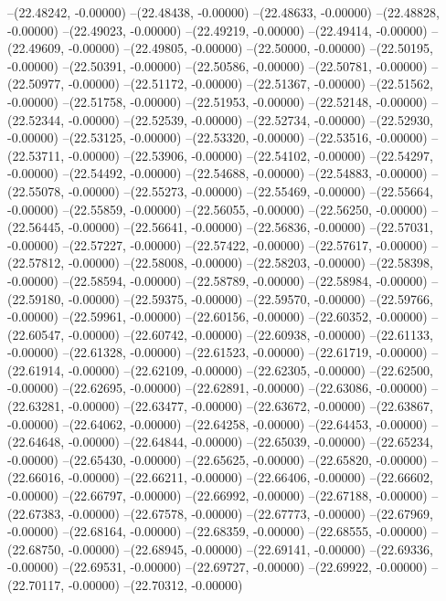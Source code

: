 --(22.48242, -0.00000)
--(22.48438, -0.00000)
--(22.48633, -0.00000)
--(22.48828, -0.00000)
--(22.49023, -0.00000)
--(22.49219, -0.00000)
--(22.49414, -0.00000)
--(22.49609, -0.00000)
--(22.49805, -0.00000)
--(22.50000, -0.00000)
--(22.50195, -0.00000)
--(22.50391, -0.00000)
--(22.50586, -0.00000)
--(22.50781, -0.00000)
--(22.50977, -0.00000)
--(22.51172, -0.00000)
--(22.51367, -0.00000)
--(22.51562, -0.00000)
--(22.51758, -0.00000)
--(22.51953, -0.00000)
--(22.52148, -0.00000)
--(22.52344, -0.00000)
--(22.52539, -0.00000)
--(22.52734, -0.00000)
--(22.52930, -0.00000)
--(22.53125, -0.00000)
--(22.53320, -0.00000)
--(22.53516, -0.00000)
--(22.53711, -0.00000)
--(22.53906, -0.00000)
--(22.54102, -0.00000)
--(22.54297, -0.00000)
--(22.54492, -0.00000)
--(22.54688, -0.00000)
--(22.54883, -0.00000)
--(22.55078, -0.00000)
--(22.55273, -0.00000)
--(22.55469, -0.00000)
--(22.55664, -0.00000)
--(22.55859, -0.00000)
--(22.56055, -0.00000)
--(22.56250, -0.00000)
--(22.56445, -0.00000)
--(22.56641, -0.00000)
--(22.56836, -0.00000)
--(22.57031, -0.00000)
--(22.57227, -0.00000)
--(22.57422, -0.00000)
--(22.57617, -0.00000)
--(22.57812, -0.00000)
--(22.58008, -0.00000)
--(22.58203, -0.00000)
--(22.58398, -0.00000)
--(22.58594, -0.00000)
--(22.58789, -0.00000)
--(22.58984, -0.00000)
--(22.59180, -0.00000)
--(22.59375, -0.00000)
--(22.59570, -0.00000)
--(22.59766, -0.00000)
--(22.59961, -0.00000)
--(22.60156, -0.00000)
--(22.60352, -0.00000)
--(22.60547, -0.00000)
--(22.60742, -0.00000)
--(22.60938, -0.00000)
--(22.61133, -0.00000)
--(22.61328, -0.00000)
--(22.61523, -0.00000)
--(22.61719, -0.00000)
--(22.61914, -0.00000)
--(22.62109, -0.00000)
--(22.62305, -0.00000)
--(22.62500, -0.00000)
--(22.62695, -0.00000)
--(22.62891, -0.00000)
--(22.63086, -0.00000)
--(22.63281, -0.00000)
--(22.63477, -0.00000)
--(22.63672, -0.00000)
--(22.63867, -0.00000)
--(22.64062, -0.00000)
--(22.64258, -0.00000)
--(22.64453, -0.00000)
--(22.64648, -0.00000)
--(22.64844, -0.00000)
--(22.65039, -0.00000)
--(22.65234, -0.00000)
--(22.65430, -0.00000)
--(22.65625, -0.00000)
--(22.65820, -0.00000)
--(22.66016, -0.00000)
--(22.66211, -0.00000)
--(22.66406, -0.00000)
--(22.66602, -0.00000)
--(22.66797, -0.00000)
--(22.66992, -0.00000)
--(22.67188, -0.00000)
--(22.67383, -0.00000)
--(22.67578, -0.00000)
--(22.67773, -0.00000)
--(22.67969, -0.00000)
--(22.68164, -0.00000)
--(22.68359, -0.00000)
--(22.68555, -0.00000)
--(22.68750, -0.00000)
--(22.68945, -0.00000)
--(22.69141, -0.00000)
--(22.69336, -0.00000)
--(22.69531, -0.00000)
--(22.69727, -0.00000)
--(22.69922, -0.00000)
--(22.70117, -0.00000)
--(22.70312, -0.00000)
